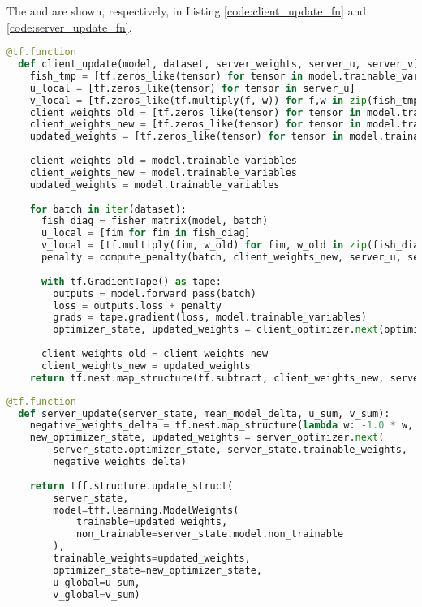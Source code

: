 The  and  are shown, respectively, in Listing \ref{code:client_update_fn} and \ref{code:server_update_fn}. \\


\begin{lstlisting}[caption={TFF implementation of the client\_update\_fn of \texttt{FedCurv}.},label={code:client_update_fn},language=Python]
@tf.function
  def client_update(model, dataset, server_weights, server_u, server_v):
    fish_tmp = [tf.zeros_like(tensor) for tensor in model.trainable_variables]
    u_local = [tf.zeros_like(tensor) for tensor in server_u]
    v_local = [tf.zeros_like(tf.multiply(f, w)) for f,w in zip(fish_tmp, server_v)]
    client_weights_old = [tf.zeros_like(tensor) for tensor in model.trainable_variables]
    client_weights_new = [tf.zeros_like(tensor) for tensor in model.trainable_variables]
    updated_weights = [tf.zeros_like(tensor) for tensor in model.trainable_variables]
    
    client_weights_old = model.trainable_variables
    client_weights_new = model.trainable_variables
    updated_weights = model.trainable_variables
    
    for batch in iter(dataset):
      fish_diag = fisher_matrix(model, batch)
      u_local = [fim for fim in fish_diag]
      v_local = [tf.multiply(fim, w_old) for fim, w_old in zip(fish_diag, client_weights_old)]
      penalty = compute_penalty(batch, client_weights_new, server_u, server_v, u_local, v_local)
      
      with tf.GradientTape() as tape:
        outputs = model.forward_pass(batch)
        loss = outputs.loss + penalty
        grads = tape.gradient(loss, model.trainable_variables)
        optimizer_state, updated_weights = client_optimizer.next(optimizer_state, client_weights_new, grads)
      
      client_weights_old = client_weights_new
      client_weights_new = updated_weights
    return tf.nest.map_structure(tf.subtract, client_weights_new, server_weights), u_local, v_local
\end{lstlisting}

\begin{lstlisting}[caption={TFF implementation of the server\_update\_fn of \texttt{FedCurv}.},label={code:server_update_fn},language=Python]
@tf.function
  def server_update(server_state, mean_model_delta, u_sum, v_sum):
    negative_weights_delta = tf.nest.map_structure(lambda w: -1.0 * w, mean_model_delta)
    new_optimizer_state, updated_weights = server_optimizer.next(
        server_state.optimizer_state, server_state.trainable_weights, 
        negative_weights_delta)
    
    return tff.structure.update_struct(
        server_state,
        model=tff.learning.ModelWeights(
            trainable=updated_weights,
            non_trainable=server_state.model.non_trainable
        ),
        trainable_weights=updated_weights,
        optimizer_state=new_optimizer_state,
        u_global=u_sum,
        v_global=v_sum)
\end{lstlisting}



